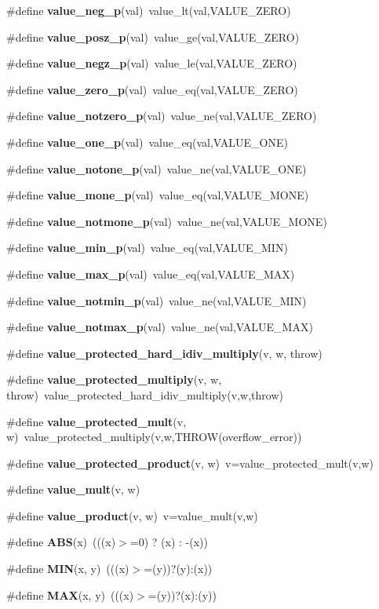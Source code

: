 \begin{CompactItemize}
\item 
\#define {\bf value\_\-neg\_\-p}(val)\ value\_\-lt(val,VALUE\_\-ZERO)
\item 
\#define {\bf value\_\-posz\_\-p}(val)\ value\_\-ge(val,VALUE\_\-ZERO)
\item 
\#define {\bf value\_\-negz\_\-p}(val)\ value\_\-le(val,VALUE\_\-ZERO)
\item 
\#define {\bf value\_\-zero\_\-p}(val)\ value\_\-eq(val,VALUE\_\-ZERO)
\item 
\#define {\bf value\_\-notzero\_\-p}(val)\ value\_\-ne(val,VALUE\_\-ZERO)
\item 
\#define {\bf value\_\-one\_\-p}(val)\ value\_\-eq(val,VALUE\_\-ONE)
\item 
\#define {\bf value\_\-notone\_\-p}(val)\ value\_\-ne(val,VALUE\_\-ONE)
\item 
\#define {\bf value\_\-mone\_\-p}(val)\ value\_\-eq(val,VALUE\_\-MONE)
\item 
\#define {\bf value\_\-notmone\_\-p}(val)\ value\_\-ne(val,VALUE\_\-MONE)
\item 
\#define {\bf value\_\-min\_\-p}(val)\ value\_\-eq(val,VALUE\_\-MIN)
\item 
\#define {\bf value\_\-max\_\-p}(val)\ value\_\-eq(val,VALUE\_\-MAX)
\item 
\#define {\bf value\_\-notmin\_\-p}(val)\ value\_\-ne(val,VALUE\_\-MIN)
\item 
\#define {\bf value\_\-notmax\_\-p}(val)\ value\_\-ne(val,VALUE\_\-MAX)
\item 
\#define {\bf value\_\-protected\_\-hard\_\-idiv\_\-multiply}(v, w, throw)
\item 
\#define {\bf value\_\-protected\_\-multiply}(v, w, throw)\ value\_\-protected\_\-hard\_\-idiv\_\-multiply(v,w,throw)
\item 
\#define {\bf value\_\-protected\_\-mult}(v, w)\ value\_\-protected\_\-multiply(v,w,THROW(overflow\_\-error))
\item 
\#define {\bf value\_\-protected\_\-product}(v, w)\ v=value\_\-protected\_\-mult(v,w)
\item 
\#define {\bf value\_\-mult}(v, w)
\item 
\#define {\bf value\_\-product}(v, w)\ v=value\_\-mult(v,w)
\item 
\#define {\bf ABS}(x)\ (((x)$>$=0) ? (x) : -(x))
\item 
\#define {\bf MIN}(x, y)\ (((x)$>$=(y))?(y):(x))
\item 
\#define {\bf MAX}(x, y)\ (((x)$>$=(y))?(x):(y))
\item 

\end{CompactItemize}
